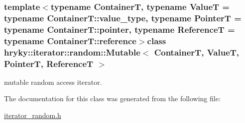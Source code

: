 \subsubsection*{template$<$typename Container\-T, typename Value\-T = typename Container\-T\-::value\-\_\-type, typename Pointer\-T = typename Container\-T\-::pointer, typename Reference\-T = typename Container\-T\-::reference$>$class hryky\-::iterator\-::random\-::\-Mutable$<$ Container\-T, Value\-T, Pointer\-T, Reference\-T $>$}

mutable random access iterator. 

The documentation for this class was generated from the following file\-:\begin{DoxyCompactItemize}
\item 
\hyperlink{iterator__random_8h}{iterator\-\_\-random.\-h}\end{DoxyCompactItemize}
